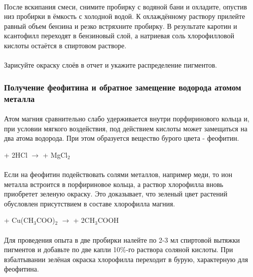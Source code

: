 \paragraph*{}После вскипания смеси, снимите пробирку с водяной бани и охладите, опустив низ пробирки в ёмкость с холодной водой. К охлаждённому раствору прилейте равный объем бензина и резко встряхните пробирку. В результате каротин и ксантофилл переходят в бензиновый слой, а натриевая соль хлорофилловой кислоты остаётся в спиртовом растворе.

\paragraph*{}Зарисуйте окраску слоёв в отчет и укажите распределение пигментов.

\subsubsection*{Получение феофитина и обратное замещение водорода атомом металла}

\paragraph*{}Атом магния сравнительно слабо удерживается внутри порфиринового кольца и, при условии мягкого воздействия, под действием кислоты может замещаться на два атома водорода. При этом образуется вещество бурого цвета - феофитин. 

 + 2HCl $\rightarrow$  +  MgCl$_{2}$

\paragraph*{}Если на феофитин подействовать солями металлов, например меди, то ион металла встроится в порфириновое кольца, а раствор хлорофилла вновь приобретет зеленую окраску. Это доказывает, что зеленый цвет растений обусловлен присутствием в составе хлорофилла магния.

  + Cu(CH$_{3}$COO)$_{2}$ $\rightarrow$  +  2CH$_{3}$COOH

\paragraph*{}Для проведения опыта в две пробирки налейте по 2-3 мл спиртовой вытяжки пигментов и добавьте по две капли 10\%-го раствора соляной кислоты. При взбалтывании зелёная окраска хлорофилла переходит в бурую, характерную для феофитина. 

